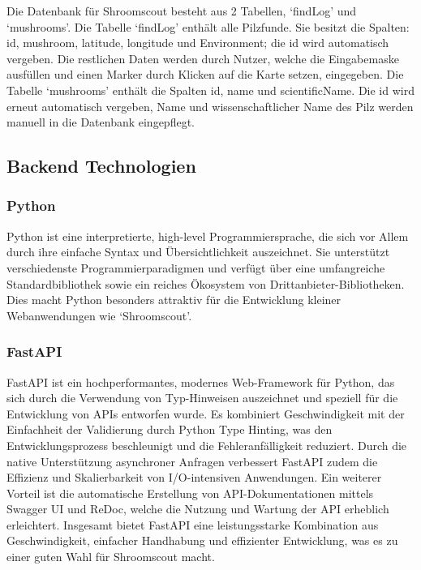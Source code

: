 \documentclass[../main.tex]{subfiles}
\begin{document}
Die Datenbank für Shroomscout besteht aus 2 Tabellen, `findLog' und `mushrooms'. Die Tabelle `findLog' enthält alle Pilzfunde. Sie besitzt die Spalten: id, mushroom,
latitude, longitude und Environment; die id wird automatisch vergeben. Die restlichen Daten werden durch Nutzer, welche die Eingabemaske ausfüllen und einen Marker
durch Klicken auf die Karte setzen, eingegeben. Die Tabelle `mushrooms' enthält die Spalten id, name und scientificName. Die id wird erneut automatisch vergeben, Name
und wissenschaftlicher Name des Pilz werden manuell in die Datenbank eingepflegt.

\subsection{Backend Technologien}

\subsubsection{Python}

Python ist eine interpretierte, high-level Programmiersprache, die sich vor Allem durch ihre einfache Syntax und Übersichtlichkeit auszeichnet. Sie unterstützt
verschiedenste Programmierparadigmen und verfügt über eine umfangreiche Standardbibliothek sowie ein reiches Ökosystem von Drittanbieter-Bibliotheken. Dies macht
Python besonders attraktiv für die Entwicklung kleiner Webanwendungen wie `Shroomscout'.

\subsubsection*{FastAPI}

FastAPI ist ein hochperformantes, modernes Web-Framework für Python, das sich durch die Verwendung von Typ-Hinweisen auszeichnet und speziell für die Entwicklung
von APIs entworfen wurde. Es kombiniert Geschwindigkeit mit der Einfachheit der Validierung durch Python Type Hinting, was den Entwicklungsprozess beschleunigt und
die Fehleranfälligkeit reduziert. Durch die native Unterstützung asynchroner Anfragen verbessert FastAPI zudem die Effizienz und Skalierbarkeit von I/O-intensiven
Anwendungen. Ein weiterer Vorteil ist die automatische Erstellung von API-Dokumentationen mittels Swagger UI und ReDoc, welche die Nutzung und Wartung der API erheblich
erleichtert. Insgesamt bietet FastAPI eine leistungsstarke Kombination aus Geschwindigkeit, einfacher Handhabung und effizienter Entwicklung, was es zu einer guten Wahl
für Shroomscout macht.
\end{document}
